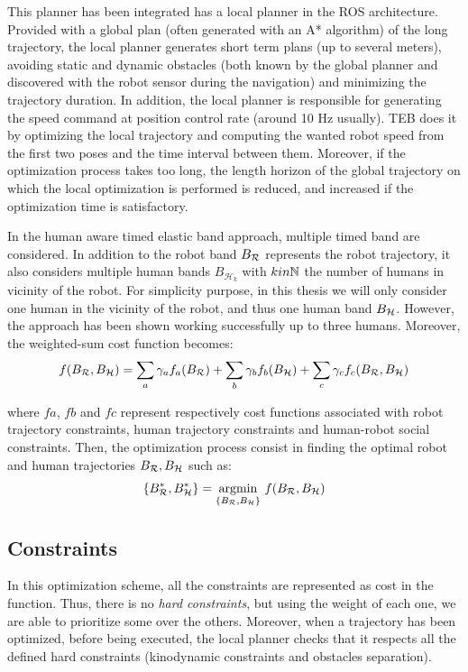 \documentclass[a4paper,11pt,twoside]{StyleThese}
\begin{document}
This planner has been integrated has a local planner in the ROS architecture. Provided with a global plan (often generated with an A* algorithm) of the long trajectory, the local planner generates short term plans (up to several meters), avoiding static and dynamic obstacles (both known by the global planner and discovered with the robot sensor during the navigation) and minimizing the trajectory duration. In addition, the local planner is responsible for generating the speed command at position control rate (around 10 Hz usually). TEB does it by optimizing the local trajectory and computing the wanted robot speed from the first two poses and the time interval between them. Moreover, if the optimization process takes too long, the length horizon of the global trajectory on which the local optimization is performed is reduced, and increased if the optimization time is satisfactory.

In the human aware timed elastic band approach, multiple timed band are considered. In addition to the robot band $B_\mathcal{R}$ represents the robot trajectory, it also considers multiple human bands $B_{\mathcal{H}_k}$ with $k in \mathbb{N}$ the number of humans in vicinity of the robot. For simplicity purpose, in this thesis we will only consider one human in the vicinity of the robot, and thus one human band $B_\mathcal{H}$. However, the approach has been shown working successfully up to three humans.
Moreover, the weighted-sum cost function becomes:
\begin{equation} \label{eq:hateb_obj_function}
f(B_\mathcal{R}, B_\mathcal{H}) = \sum_a \gamma_a f_a(B_\mathcal{R}) + \sum_b \gamma_b f_b(B_\mathcal{H}) + \sum_c \gamma_c f_c(B_\mathcal{R}, B_\mathcal{H})
\end{equation}   

where $fa$, $fb$ and $fc$ represent respectively cost functions associated with robot trajectory constraints, human trajectory constraints and human-robot social constraints. Then, the optimization process consist in finding the optimal robot and human trajectories $B_\mathcal{R}, B_\mathcal{H}$ such as:
\[\{B_\mathcal{R}^*, B_\mathcal{H}^*\} = \mathop{\mathrm{argmin}}_{\{B_\mathcal{R}, B_\mathcal{H}\}}\,f(B_\mathcal{R}, B_\mathcal{H})\]





\subsection{Constraints}
In this optimization scheme, all the constraints are represented as cost in the function. Thus, there is no \textit{hard constraints}, but using the weight of each one, we are able to prioritize some over the others. Moreover, when a trajectory has been optimized, before being executed, the local planner checks that it respects all the defined hard constraints (kinodynamic constraints and obstacles separation).
\end{document}
